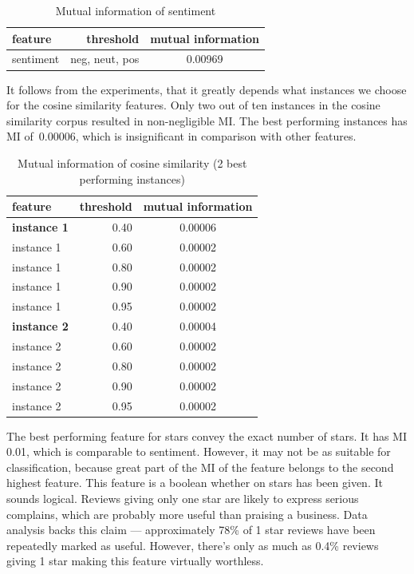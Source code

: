 \begin{table}[h!]
\centering
\begin{tabular}{lrS[table-format=3.2]}
\toprule
\textbf{feature} & \textbf{threshold} & \textbf{mutual information} \\
\midrule
sentiment & neg, neut, pos & 0.00969 \\
\bottomrule
\end{tabular}
\caption{Mutual information of sentiment}\label{tab:mi_sentiment}
\end{table}

It follows from the experiments, that it greatly depends what instances
we choose for the cosine similarity features.
Only two out of ten instances in the cosine similarity corpus resulted in
non-negligible MI.
The best performing instances has MI of~\num{0.00006}, which is insignificant
in comparison with other features.

\begin{table}[h!]
\centering
\begin{tabular}{lrS[table-format=3.2]}
\toprule
\textbf{feature} & \textbf{threshold} & \textbf{mutual information} \\
\midrule
\textbf{instance 1} & 0.40 & 0.00006 \\
instance 1 & 0.60 & 0.00002 \\
instance 1 & 0.80 & 0.00002 \\
instance 1 & 0.90 & 0.00002 \\
instance 1 & 0.95 & 0.00002 \\
\midrule
\textbf{instance 2} & 0.40 & 0.00004 \\
instance 2 & 0.60 & 0.00002 \\
instance 2 & 0.80 & 0.00002 \\
instance 2 & 0.90 & 0.00002 \\
instance 2 & 0.95 & 0.00002 \\
\bottomrule
\end{tabular}
\caption{Mutual information of cosine similarity (2 best performing instances)}\label{tab:mi_cossim}
\end{table}

The best performing feature for stars convey the exact number of stars.
It has MI 0.01, which is comparable to sentiment.
However, it may not be as suitable for classification,
because great part of the MI of the feature belongs to the second highest feature.
This feature is a boolean whether on stars has been given.
It sounds logical.
Reviews giving only one star are likely to express serious complains, which are probably more useful than praising a business.
Data analysis backs this claim --- approximately 78\% of 1 star reviews have been repeatedly marked as useful.
However, there's only as much as 0.4\% reviews giving 1 star making this
feature virtually worthless.

